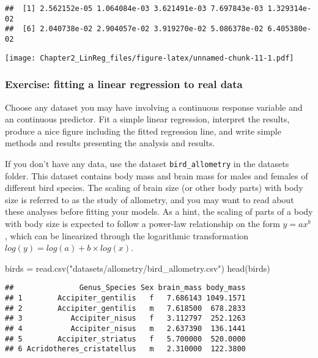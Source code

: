 \documentclass[
]{article}
\newenvironment{Shaded}{\begin{snugshade}}{\end{snugshade}}
\newcommand{\FunctionTok}[1]{\textcolor[rgb]{0.00,0.00,0.00}{#1}}
\newcommand{\NormalTok}[1]{#1}
\newcommand{\OtherTok}[1]{\textcolor[rgb]{0.56,0.35,0.01}{#1}}
\newcommand{\StringTok}[1]{\textcolor[rgb]{0.31,0.60,0.02}{#1}}
\begin{document}
\begin{verbatim}
##  [1] 2.562152e-05 1.064084e-03 3.621491e-03 7.697843e-03 1.329314e-02
##  [6] 2.040738e-02 2.904057e-02 3.919270e-02 5.086378e-02 6.405380e-02
\end{verbatim}

\texttt{[image: Chapter2\_LinReg\_files/figure-latex/unnamed-chunk-11-1.pdf]}

\hypertarget{exercise-fitting-a-linear-regression-to-real-data}{%
\subsubsection{Exercise: fitting a linear regression to real
data}\label{exercise-fitting-a-linear-regression-to-real-data}}

Choose any dataset you may have involving a continuous response variable
and an continuous predictor. Fit a simple linear regression, interpret
the results, produce a nice figure including the fitted regression line,
and write simple methods and results presenting the analysis and
results.

If you don't have any data, use the dataset \texttt{bird\_allometry} in
the datasets folder. This dataset contains body mass and brain mass for
males and females of different bird species. The scaling of brain size
(or other body parts) with body size is referred to as the study of
allometry, and you may want to read about these analyses before fitting
your models. As a hint, the scaling of parts of a body with body size is
expected to follow a power-law relationship on the form \(y = ax^b\),
which can be linearized through the logarithmic transformation
\(log(y) =log(a) + b \times log(x)\).

\begin{Shaded}
\begin{Highlighting}[]
\NormalTok{birds }\OtherTok{=} \FunctionTok{read.csv}\NormalTok{(}\StringTok{"datasets/allometry/bird\_allometry.csv"}\NormalTok{)}
\FunctionTok{head}\NormalTok{(birds)}
\end{Highlighting}
\end{Shaded}

\begin{verbatim}
##               Genus_Species Sex brain_mass body_mass
## 1        Accipiter_gentilis   f   7.686143 1049.1571
## 2        Accipiter_gentilis   m   7.618500  678.2833
## 3           Accipiter_nisus   f   3.112797  252.1263
## 4           Accipiter_nisus   m   2.637390  136.1441
## 5        Accipiter_striatus   f   5.700000  520.0000
## 6 Acridotheres_cristatellus   m   2.310000  122.3800
\end{verbatim}
\end{document}

